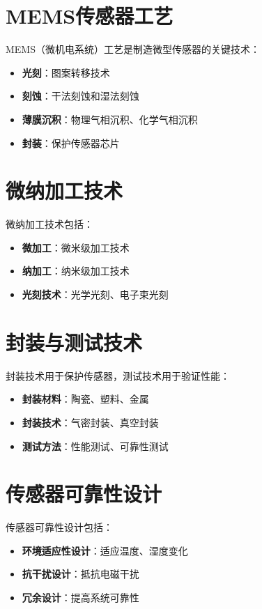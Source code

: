 \documentclass[12pt,UTF8]{ctexbook}
\begin{document}
\section{MEMS传感器工艺}

MEMS（微机电系统）工艺是制造微型传感器的关键技术：

\begin{itemize}[leftmargin=2cm]
	\item \textbf{光刻}：图案转移技术
	\item \textbf{刻蚀}：干法刻蚀和湿法刻蚀
	\item \textbf{薄膜沉积}：物理气相沉积、化学气相沉积
	\item \textbf{封装}：保护传感器芯片
\end{itemize}

\section{微纳加工技术}

微纳加工技术包括：

\begin{itemize}[leftmargin=2cm]
	\item \textbf{微加工}：微米级加工技术
	\item \textbf{纳加工}：纳米级加工技术
	\item \textbf{光刻技术}：光学光刻、电子束光刻
\end{itemize}

\section{封装与测试技术}

封装技术用于保护传感器，测试技术用于验证性能：

\begin{itemize}[leftmargin=2cm]
	\item \textbf{封装材料}：陶瓷、塑料、金属
	\item \textbf{封装技术}：气密封装、真空封装
	\item \textbf{测试方法}：性能测试、可靠性测试
\end{itemize}

\section{传感器可靠性设计}

传感器可靠性设计包括：

\begin{itemize}[leftmargin=2cm]
	\item \textbf{环境适应性设计}：适应温度、湿度变化
	\item \textbf{抗干扰设计}：抵抗电磁干扰
	\item \textbf{冗余设计}：提高系统可靠性
\end{itemize}
\end{document}
